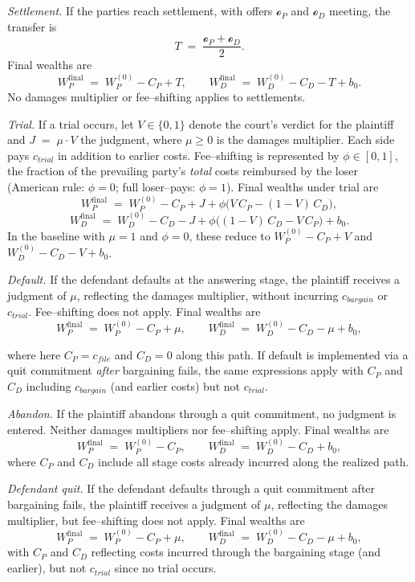 \documentclass{article}
\begin{document}
\emph{Settlement.} If the parties reach settlement, with offers $\mathcal{o}_P$ and $\mathcal{o}_D$ meeting, the transfer is
\[
T \;=\; \frac{\mathcal{o}_P+\mathcal{o}_D}{2}.
\]
Final wealths are
\[
W_P^{\mathrm{final}} \;=\; W_P^{(0)} - C_P + T,
\qquad
W_D^{\mathrm{final}} \;=\; W_D^{(0)} - C_D - T + b_0.
\]
No damages multiplier or fee–shifting applies to settlements.

\emph{Trial.} If a trial occurs, let $V\in\{0,1\}$ denote the court’s verdict for the plaintiff and $J \;=\; \mu \cdot V$ the judgment, where $\mu\ge 0$ is the damages multiplier. Each side pays $c_{trial}$ in addition to earlier costs. Fee–shifting is represented by $\phi\in[0,1]$, the fraction of the prevailing party’s \emph{total} costs reimbursed by the loser (American rule: $\phi=0$; full loser–pays: $\phi=1$). Final wealths under trial are
\[
W_P^{\mathrm{final}}
\;=\;
W_P^{(0)} - C_P + J + \phi\bigl(V\,C_P - (1-V)\,C_D\bigr),
\]
\[
W_D^{\mathrm{final}}
\;=\;
W_D^{(0)} - C_D - J + \phi\bigl((1-V)\,C_D - V\,C_P\bigr) + b_0.
\]
In the baseline with $\mu=1$ and $\phi=0$, these reduce to $W_P^{(0)}-C_P+V$ and $W_D^{(0)}-C_D-V+b_0$.

\emph{Default.} If the defendant defaults at the answering stage, the plaintiff receives a judgment of $\mu$, reflecting the damages multiplier, without incurring $c_{bargain}$ or $c_{trial}$. Fee–shifting does not apply.
Final wealths are
\[
W_P^{\mathrm{final}} \;=\; W_P^{(0)} - C_P + \mu,
\qquad
W_D^{\mathrm{final}} \;=\; W_D^{(0)} - C_D - \mu + b_0,
\]

where here $C_P=c_{file}$ and $C_D=0$ along this path. If default is implemented via a quit commitment \emph{after} bargaining fails, the same expressions apply with $C_P$ and $C_D$ including $c_{bargain}$ (and earlier costs) but not $c_{trial}$.

\emph{Abandon.} If the plaintiff abandons through a quit commitment, no judgment is entered. Neither damages multipliers nor fee–shifting apply. Final wealths are
\[
W_P^{\mathrm{final}} \;=\; W_P^{(0)} - C_P,
\qquad
W_D^{\mathrm{final}} \;=\; W_D^{(0)} - C_D + b_0,
\]
where $C_P$ and $C_D$ include all stage costs already incurred along the realized path.

\emph{Defendant quit.} If the defendant defaults through a quit commitment after bargaining fails, the plaintiff receives a judgment of $\mu$, reflecting the damages multiplier, but fee–shifting does not apply. Final wealths are
\[
W_P^{\mathrm{final}} \;=\; W_P^{(0)} - C_P + \mu,
\qquad
W_D^{\mathrm{final}} \;=\; W_D^{(0)} - C_D - \mu + b_0,
\]
with $C_P$ and $C_D$ reflecting costs incurred through the bargaining stage (and earlier), but not $c_{trial}$ since no trial occurs.
\end{document}
